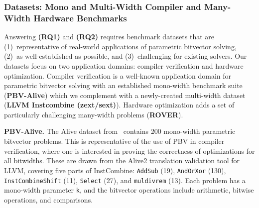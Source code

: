 \subsubsection{Datasets: Mono and Multi-Width Compiler and Many-Width Hardware Benchmarks}
Answering \textbf{(RQ1)} and \textbf{(RQ2)} requires benchmark datasets that are
(1)~representative of real-world applications of parametric bitvector solving,
(2)~as well-established as possible,
and (3)~challenging for existing solvers. Our datasets focus on two application domains:
compiler verification and hardware optimization. Compiler verification is a
well-known application domain for parametric bitvector solving with an
established mono-width benchmark suite (\textbf{PBV-Alive}) which we complement
with a newly-created multi-width dataset (\textbf{LLVM Instcombine (zext/sext)}). Hardware
optimization adds a set of particularly challenging many-width problems (\textbf{ROVER}).

\noindent\textbf{PBV-Alive.}
The Alive dataset from~\citet{bit-precise-parametric-bv} contains 200 mono-width parametric bitvector problems.
This is representative of the use of PBV in compiler verification, where one is interested in proving the correctness of optimizations for all bitwidths.
These are drawn from the Alive2 translation validation tool for LLVM,
covering five parts of InstCombine: \texttt{AddSub} (19), \texttt{AndOrXor} (130), \texttt{InstCombineShift} (11),
\texttt{Select} (27), and \texttt{muldivrem} (13).
Each problem has a mono-width parameter \texttt{k},
and the bitvector operations include arithmetic, bitwise operations, and comparisons.

